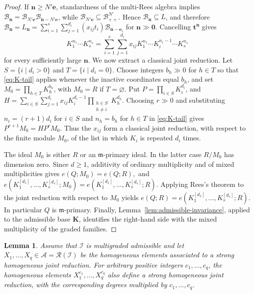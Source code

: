 \documentclass[reqno,12pt]{amsart}
\theoremstyle{plain}
\newtheorem{lem}[prop]{Lemma}
\theoremstyle{definition}
\theoremstyle{remark}
\numberwithin{equation}{section}
\begin{document}
\begin{proof}
If $\mathbf n\geq N'\mathbf e$, standardness of the multi-Rees algebra
implies
$\mathcal B_{\mathbf n}
=\mathcal B_{N'\mathbf e}
 \mathcal B_{\mathbf n-N'\mathbf e}$, while
$\mathcal B_{N'\mathbf e}\subseteq\mathcal B_{++}^{N'}$. Hence
$\mathcal B_{\mathbf n}\subseteq L$, and therefore $\mathcal B_{\mathbf n}=L_{\mathbf n}
=
\sum_{i=1}^{s}\sum_{j=1}^{d_i}
 (x_{ij}t_i)\mathcal B_{\mathbf n-\mathbf e_i}$ for  $\mathbf n\gg\mathbf0.$
Cancelling $\mathbf t^{\mathbf n}$ gives
\begin{equation}
\label{eq:K-tail}
K_1^{n_1}\cdots K_s^{n_s}
=
\sum_{i=1}^{s}\sum_{j=1}^{d_i}
 x_{ij}K_1^{n_1}\cdots K_i^{n_i-1}\cdots K_s^{n_s}
\end{equation}
for every sufficiently large $\mathbf n$.
We now extract a classical joint reduction. Let
$S=\{i\mid d_i>0\}$ and $T=\{i\mid d_i=0\}$. Choose integers
$b_h\gg0$ for $h\in T$ so that
\eqref{eq:K-tail} applies whenever the inactive coordinates equal
$b_h$, and set
$M_0=\prod_{h\in T}K_h^{b_h}$, with $M_0=R$ if $T=\varnothing$.
Put $P=\prod_{i\in S}K_i^{d_i}$, and $H=
\sum_{i\in S}\sum_{j=1}^{d_i}
 x_{ij}K_i^{d_i-1}
 \prod_{\substack{h\in S\\h\neq i}}K_h^{d_h}.$
Choosing $r\gg0$ and substituting
$n_i=(r+1)d_i$ for $i\in S$ and $n_h=b_h$ for $h\in T$ in
\eqref{eq:K-tail} gives
$P^{r+1}M_0=HP^rM_0$. Thus the $x_{ij}$ form a classical joint reduction,
with respect to the finite module $M_0$, of the list in which $K_i$ is
repeated $d_i$ times.

The ideal $M_0$ is either $R$ or an $\mathfrak m$-primary ideal. In the
latter case $R/M_0$ has dimension zero. Since $d\geq1$, additivity of
ordinary multiplicity and of mixed multiplicities
\cite[Theorem~11.2.4 and Lemma~17.4.4]{SwansonHuneke} gives $e(Q;M_0)=e(Q;R),$ and $e(K_1^{[d_1]},\ldots,K_s^{[d_s]};M_0)
 =e(K_1^{[d_1]},\ldots,K_s^{[d_s]};R).$
Applying Rees's theorem \cite[Theorem~17.4.9]{SwansonHuneke} to the
joint reduction with respect to $M_0$ yields $e(Q;R)=e(K_1^{[d_1]},\ldots,K_s^{[d_s]};R).$
In particular $Q$ is $\mathfrak m$-primary. Finally,
Lemma~\ref{lem:admissible-invariance}, applied to the admissible base
$\mathbf K$, identifies the right-hand side with the mixed multiplicity
of the graded families.
\end{proof}



\begin{lem}
\label{lem:power-stability}
Assume that $\boldsymbol{\mathcal I}$ is multigraded admissible and let
$X_1,\ldots,X_q\in\mathcal A=\mathcal R(\boldsymbol{\mathcal I})$ be
the homogeneous elements associated to a strong homogeneous joint
reduction. For arbitrary positive integers $c_1,\ldots,c_q$, the
homogeneous elements $X_1^{c_1},\ldots,X_q^{c_q}$ also define a strong
homogeneous joint reduction, with the corresponding degrees multiplied
by $c_1,\ldots,c_q$.
\end{lem}
\end{document}
